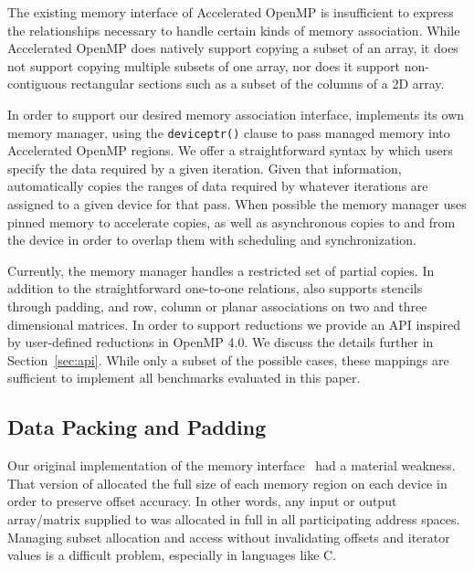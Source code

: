 The existing memory interface of Accelerated OpenMP is insufficient to express
the relationships necessary to handle certain kinds of memory association.
While Accelerated OpenMP does natively support copying a subset of an array,
it does not support copying multiple subsets of one array, nor does it support
non-contiguous rectangular sections such as a subset of the columns of a 2D
array.

In order to support our desired memory association interface, \tsar
implements its own memory manager, using the \verb#deviceptr()# clause to pass
\tsar managed memory into Accelerated OpenMP regions.  We offer a
straightforward syntax by which users specify the data required by a given
iteration.  Given that information, \tsar automatically copies the ranges of
data required by whatever iterations are assigned to a given device for that
pass.  When possible the memory manager uses pinned memory to accelerate
copies, as well as asynchronous copies to and from the device in order to
overlap them with scheduling and synchronization.

Currently, the \tsar memory manager handles a restricted set of partial
copies.  In addition to the straightforward one-to-one relations, \tsar also
supports stencils through padding, and row, column or planar associations on
two and three dimensional matrices.  In order to support reductions we provide
an API inspired by user-defined reductions in OpenMP 4.0. We discuss the
details further in Section~\ref{sec:api}. While only a subset of the possible
cases, these mappings are sufficient to implement all benchmarks evaluated in
this paper.

\subsection{Data Packing and Padding}
\label{sec:packing}



Our original implementation of the memory interface~\cite{scogland:7Hpt64iV} 
had a material weakness. That version of \tsar
allocated the full size of each memory region on each device in order to
preserve offset accuracy. In other words, any input or output array/matrix
supplied to \tsar was allocated in full in all participating address spaces.
Managing subset allocation and access without invalidating offsets and
iterator values is a difficult problem, especially in languages like C. 

